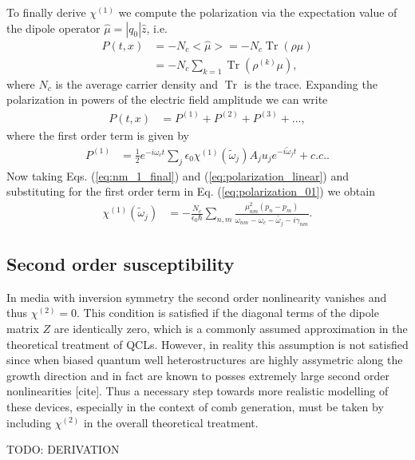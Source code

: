 \documentclass[journal]{IEEEtran}
\DeclareMathOperator{\Tr}{Tr}
\begin{document}
To finally derive $\chi^{(1)}$ we compute the polarization via the expectation value of the dipole operator $\hat\mu = |q_0|\hat{z}$, i.e. 
\begin{align}
\label{eq:polarization_01}
P(t,x) &= -N_c<\hat \mu> = -N_c \Tr(\rho \mu)\nonumber \\
	&= -N_c\sum_{k=1}\Tr(\rho^{(k)}\mu),
\end{align}
where $N_c$ is the average carrier density and $\Tr$ is the trace. Expanding the polarization in powers of the electric field amplitude we can write 
\begin{align}
\label{eq:polarization_02}
P(t,x) &= P^{(1)}+P^{(2)}+P^{(3)} + ...,
\end{align}
where the first order term is given by 
\begin{align}
\label{eq:polarization_linear}
P^{(1)} &=  \frac{1}{2}e^{-i\omega_ct}\sum_{j}\epsilon_0 \chi^{(1)}(\tilde{\omega}_j) A_ju_je^{-i\tilde\omega_jt} + c.c..
\end{align}
Now taking Eqs. (\ref{eq:nm_1_final}) and (\ref{eq:polarization_linear}) and substituting for the first order term in Eq. (\ref{eq:polarization_01}) we obtain 
\begin{align}
\label{eq:polarization_linear_final}
\chi^{(1)}(\tilde\omega_j) &=  -\frac{N_c}{\epsilon_0\hbar}\sum_{n,m} \frac{\mu_{nm}^2(p_n-p_m)}{\omega_{nm}-\omega_c-\tilde{\omega_j}-i\gamma_{nm}}.
\end{align}


 


\subsection{Second order susceptibility}
In media with inversion symmetry the second order nonlinearity vanishes and thus $\chi^{(2)} = 0$. This condition is satisfied if the diagonal terms of the dipole matrix $Z$ are identically zero, which is a commonly assumed approximation in the theoretical treatment of QCLs. However, in reality this assumption is not satisfied since when biased quantum well heterostructures are highly assymetric along the growth direction and in fact are known to posses extremely large second order nonlinearities [cite]. Thus a necessary step towards more realistic modelling of these devices, especially in the context of comb generation, must be taken by including $\chi^{(2)}$ in the overall theoretical treatment. 

TODO: DERIVATION
\end{document}
